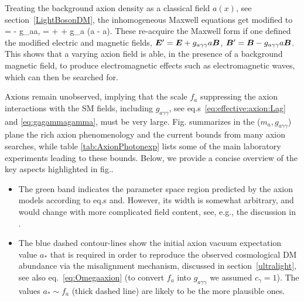 Treating the background axion density as a classical field $a(x)$, see section~\ref{LightBosonDM}, 
the inhomogeneous Maxwell equations get modified to
\beq \mb{\nabla}\cdot{}= \rho  - g_{a\gamma\gamma}\cdot\mb{\nabla}a,\qquad
\mb{\nabla}\times{}= +  + g_{a\gamma\gamma} (\dot a -\times\mb{\nabla} a).\eeq
These re-acquire the Maxwell form if one defined the modified electric and magnetic fields,  
$\bm{E}'=\bm{E} +  g_{a\gamma\gamma}a \bm{B}$, 
$\bm{B}' = \bm{B} -  g_{a\gamma\gamma}a \bm{B}$. 
This shows that a varying axion field is able, in the presence of a background magnetic field, to produce electromagnetic effects such as electromagnetic waves, which can then be searched for.

\medskip

Axions remain unobserved, implying that the scale $f_a$ suppressing the axion interactions with the SM fields, including $g_{a\gamma\gamma}$, see eq.s~\eqref{eq:effective:axion:Lag} and \eqref{eq:gagammagamma}, must be very large.
Fig. summarizes in the ($m_a,g_{a\gamma\gamma}$) plane the rich axion phenomenology and the current bounds from many axion searches, while table \ref{tab:AxionPhotonexp} lists some of the main laboratory experiments leading  to these bounds.
Below, we provide a concise overview of the key aspects highlighted in
fig..
\begin{itemize}
\item[\scalebox{0.6}{$\blacksquare$}]
The green band indicates the parameter space region predicted by the axion models according to eq.s and. However,
its width is somewhat arbitrary, and would change with more complicated field content,  see, e.g., the discussion in \cite{DiLuzio:2016sbl}.

\item[\scalebox{0.6}{$\blacksquare$}] The blue dashed contour-lines show the initial axion vacuum expectation value $a_*$ that is required in order  to reproduce the observed cosmological DM abundance
via the misalignment mechanism, discussed in section~\ref{ultralight}, see also eq.~\eqref{eq:Omegaaxion}
(to convert $f_a$ into $g_{a\gamma\gamma}$ we assumed $c_\gamma = 1$).
The values $a_* \sim f_a$ (thick dashed line) are likely to be the more plausible ones.
\end{itemize}



